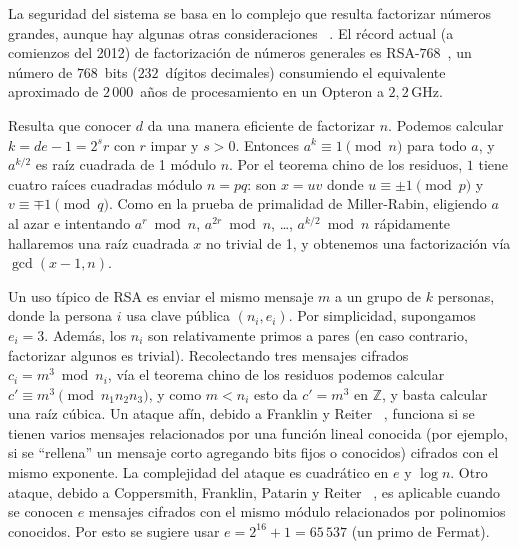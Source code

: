   La seguridad del sistema
  se basa en lo complejo que resulta factorizar números grandes,
  aunque hay algunas otras consideraciones~%
    \cite{boneh99:_twenty_years_attack_RSA,
	  durfee02:_crypt_rsa_using_algeb_lattice_method,
	  salah06:_mathem_attac_rsa_crypt}.
  El récord actual
  (a comienzos del 2012)
  de factorización de números generales%
  es RSA\nobreakdash-\(768\)~\cite{cryptoeprint:2010:006},
  un número de \(768\)~bits
  (\(232\)~dígitos decimales)
  consumiendo el equivalente aproximado
  de \(2\,000\)~años de procesamiento
  en un Opteron a \(2,2\)\,GHz.

  Resulta que conocer \(d\)
  da una manera eficiente de factorizar \(n\).
  Podemos calcular \(k = d e - 1 = 2^s r\)
  con \(r\) impar y \(s > 0\).
  Entonces \(a^k \equiv 1 \pmod{n}\) para todo \(a\),
  y \(a^{k / 2}\) es raíz cuadrada de 1 módulo \(n\).
  Por el teorema chino de los residuos,
  \(1\) tiene cuatro raíces cuadradas módulo \(n = p q\):
  son \(x = u v\)
  donde \(u \equiv \pm 1 \pmod{p}\) y \(v \equiv \mp 1 \pmod{q}\).
  Como en la prueba de primalidad de Miller-Rabin,%
  eligiendo \(a\) al azar e intentando
  \(a^r \bmod n\), \(a^{2r} \bmod n\), \ldots, \(a^{k / 2} \bmod n\)
  rápidamente hallaremos una raíz cuadrada \(x\) no trivial de 1,
  y obtenemos una factorización vía \(\gcd(x - 1, n)\).

  Un uso típico de RSA es enviar el mismo mensaje \(m\)
  a un grupo de \(k\) personas,
  donde la persona \(i\) usa clave pública \((n_i, e_i)\).
  Por simplicidad,
  supongamos \(e_i = 3\).
  Además,
  los \(n_i\) son relativamente primos a pares
  (en caso contrario,
   factorizar algunos es trivial).
  Recolectando tres mensajes cifrados \(c_i = m^3 \bmod n_i\),
  vía el teorema chino de los residuos podemos calcular
  \(c' \equiv m^3 \pmod{n_1 n_2 n_3}\),
  y como \(m < n_i\) esto da \(c' = m^3\) en \(\mathbb{Z}\),
  y basta calcular una raíz cúbica.
  Un ataque afín,
  debido a Franklin y Reiter~%
     \cite{franklin95:_linear_protoc_failure_rsa_exp_three},
  funciona si se tienen varios mensajes
  relacionados por una función lineal conocida
  (por ejemplo,
   si se ``rellena'' un mensaje corto
   agregando bits fijos o conocidos)
  cifrados con el mismo exponente.
  La complejidad del ataque es cuadrático en \(e\) y \(\log n\).
  Otro ataque,
  debido a Coppersmith, Franklin, Patarin y Reiter~%
    \cite{coppersmith96:_low_exp_rsa_relat_mesgs},
  es aplicable cuando se conocen \(e\) mensajes cifrados
  con el mismo módulo
  relacionados por polinomios conocidos.
  Por esto se sugiere usar \(e = 2^{16} + 1 = 65\,537\)
  (un primo de Fermat).

